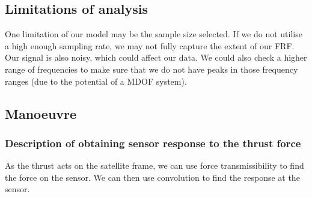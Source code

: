 \documentclass[11pt]{article}
\numberwithin{equation}{section}
\begin{document}
\subsection{Limitations of analysis}
One limitation of our model may be the sample size selected. If we do not utilise a high enough sampling rate, we may not fully capture the extent of our FRF. Our signal is also noisy, which could affect our data. We could also check a higher range of frequencies to make sure that we do not have peaks in those frequency ranges (due to the potential of a MDOF system).
\subsection{Manoeuvre}
\subsubsection{Description of obtaining sensor response to the thrust force}
As the thrust acts on the satellite frame, we can use force transmissibility to find the force on the sensor. We can then use convolution to find the response at the sensor.
\end{document}
